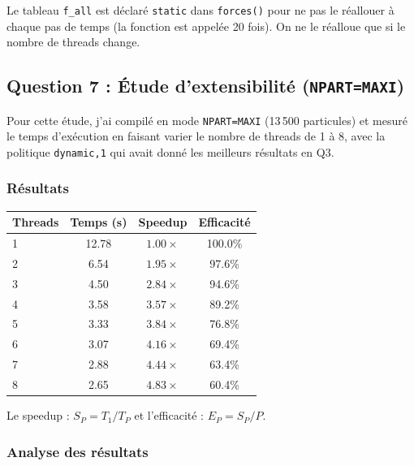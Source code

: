 \documentclass[12pt,a4paper]{article}
\begin{document}
\begin{infobox}
Le tableau \texttt{f\_all} est déclaré \texttt{static} dans \texttt{forces()} pour ne pas le réallouer à chaque pas de temps (la fonction est appelée 20 fois). On ne le réalloue que si le nombre de threads change.
\end{infobox}

\subsection{Question 7 : Étude d'extensibilité (\texttt{NPART=MAXI})}

Pour cette étude, j'ai compilé en mode \texttt{NPART=MAXI} (13\,500 particules) et mesuré le temps d'exécution en faisant varier le nombre de threads de 1 à 8, avec la politique \texttt{dynamic,1} qui avait donné les meilleurs résultats en Q3.

\subsubsection{Résultats}

\begin{center}
\begin{tabular}{lccc}
\toprule
\textbf{\color{mainblue}Threads} & \textbf{\color{mainblue}Temps (s)} & \textbf{\color{mainblue}Speedup} & \textbf{\color{mainblue}Efficacité} \\
\midrule
1 & 12.78 & $1.00\times$ & 100.0\% \\
2 &  6.54 & $1.95\times$ &  97.6\% \\
3 &  4.50 & $2.84\times$ &  94.6\% \\
4 &  3.58 & $3.57\times$ &  89.2\% \\
5 &  3.33 & $3.84\times$ &  76.8\% \\
6 &  3.07 & $4.16\times$ &  69.4\% \\
7 &  2.88 & $4.44\times$ &  63.4\% \\
\rowcolor{resultgreen} 8 &  2.65 & $4.83\times$ &  60.4\% \\
\bottomrule
\end{tabular}
\end{center}

\begin{infobox}[Rappel]
Le speedup : $S_P = T_1 / T_P$ \quad et l'efficacité : $E_P = S_P / P$.
\end{infobox}

\subsubsection{Analyse des résultats}
\end{document}
